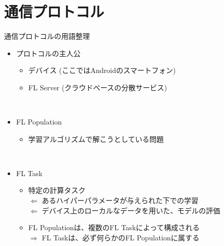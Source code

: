 \documentclass[dvipdfmx,notheorems,t]{beamer}
\begin{document}

\section{通信プロトコル}

\begin{frame}{通信プロトコルの用語整理}

\begin{itemize}
	\item プロトコルの主人公
	\begin{itemize}
		\item デバイス (ここではAndroidのスマートフォン)
		\item \alert{FL Server} (クラウドベースの分散サービス)
	\end{itemize} \
	
	\item \alert{FL Population}
	\begin{itemize}
		\item 学習アルゴリズムで解こうとしている問題
	\end{itemize} \
	
	\item \alert{FL Task}
	\begin{itemize}
		\item 特定の計算タスク \\
		$\Leftarrow$ あるハイパーパラメータが与えられた下での学習 \\
		$\Leftarrow$ デバイス上のローカルなデータを用いた、モデルの評価
		\newline
		\item FL Populationは、複数のFL Taskによって構成される \\
		$\Rightarrow$ FL Taskは、必ず何らかのFL Populationに属する
	\end{itemize}
\end{itemize}

\end{frame}
\end{document}
